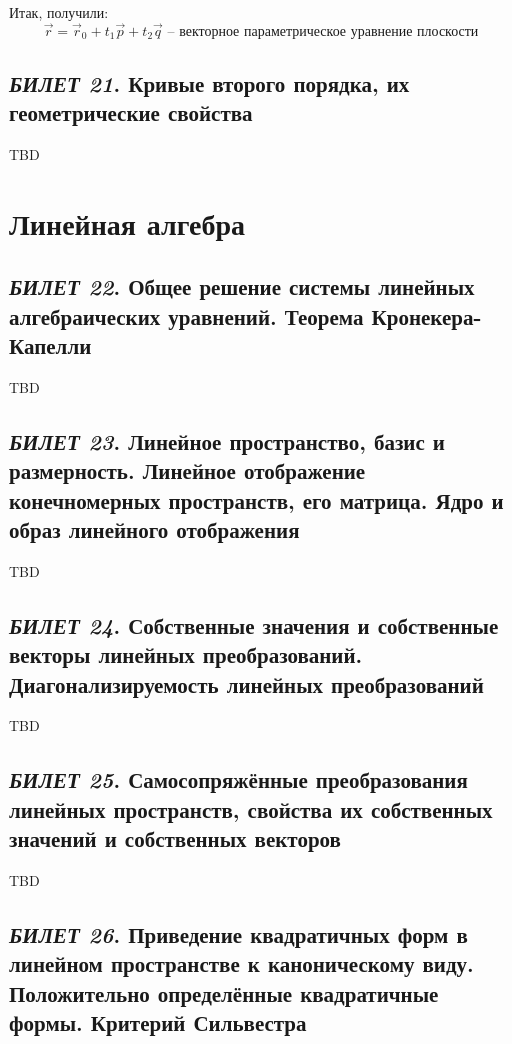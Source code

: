 \documentclass[12pt, a4paper, reqno]{article}
\begin{document}
    Итак, получили:
    \begin{equation*}
        \boxed{\vec{r} = \vec{r}_0 + t_1\vec{p} + t_2\vec{q}}
        \text{ -- векторное параметрическое уравнение плоскости}
    \end{equation*}

\newpage
\subsection{\textit{БИЛЕТ 21}. Кривые второго порядка, их геометрические свойства}

    TBD

\newpage
\section{Линейная алгебра}

\newpage
\subsection{\textit{БИЛЕТ 22}. Общее решение системы линейных алгебраических уравнений. Теорема
            Кронекера-Капелли}

    TBD

\newpage
\subsection{\textit{БИЛЕТ 23}. Линейное пространство, базис и размерность. Линейное отображение
            конечномерных пространств, его матрица. Ядро и образ линейного отображения}

    TBD

\newpage
\subsection{\textit{БИЛЕТ 24}. Собственные значения и собственные векторы линейных преобразований.
            Диагонализируемость линейных преобразований}

    TBD

\newpage
\subsection{\textit{БИЛЕТ 25}. Самосопряжённые преобразования линейных пространств, свойства их
            собственных значений и собственных векторов}

    TBD

\newpage
\subsection{\textit{БИЛЕТ 26}. Приведение квадратичных форм в линейном пространстве к каноническому
            виду. Положительно определённые квадратичные формы. Критерий Сильвестра}
\end{document}
